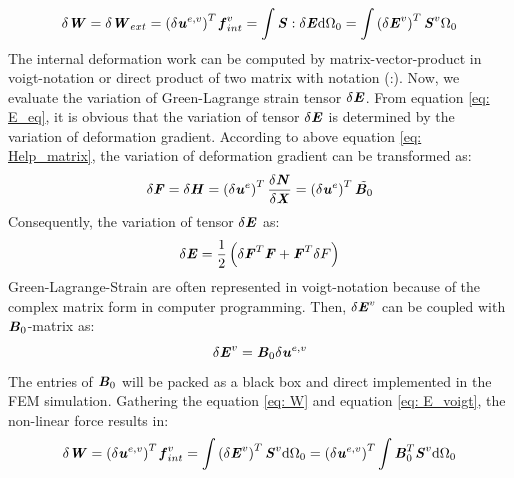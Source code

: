 \begin{equation} \label{eq: W}
\delta \textbf{\textit{W}} = \delta \textbf{\textit{W}}_{ext} = \left(\delta \textbf{\textit{u}}^{e,v}\right)^T \textbf{\textit{f}}_{int}^v = \int \textbf{\textit{S}} : \delta \textbf{\textit{E}} \mathrm{d}\Omega_0 = \int \left( \delta \textbf{\textit{E}}^v\right)^T \textbf{\textit{S}}^v \mathrm{\Omega_0}
\end{equation}
The internal deformation work can be computed by matrix-vector-product in voigt-notation or direct product of two matrix with notation (:). Now, we evaluate the variation of Green-Lagrange strain tensor $\delta \textbf{\textit{E}}$. From equation \ref{eq: E_eq}, it is obvious that the variation of tensor $\delta \textbf{\textit{E}}$ is determined by the variation of deformation gradient. According to above equation \ref{eq: Help_matrix}, the variation of deformation gradient can be transformed as:
\begin{equation}
\delta \textbf{\textit{F}} = \delta \textbf{\textit{H}} = \left(\delta \textbf{\textit{u}}^e\right)^T \frac{\delta \textbf{\textit{N}}}{\delta \textbf{\textit{X}}} = \left(\delta \textbf{\textit{u}}^e\right)^T \tilde{\textbf{\textit{B}}_0}
\end{equation}
Consequently, the variation of tensor $\delta \textbf{\textit{E}}$ as:
\begin{equation}
\delta \textbf{\textit{E}} = \frac{1}{2} \left(\delta \textbf{\textit{F}}^T \textbf{\textit{F}} + \textbf{\textit{F}}^T \delta F \right)
\end{equation}
Green-Lagrange-Strain are often represented in voigt-notation because of the complex matrix form in computer programming. Then, $\delta \textbf{\textit{E}}^v$ can be coupled with $\textbf{\textit{B}}_0$-matrix as:
\begin{equation} \label{eq: E_voigt}
\delta \textbf{\textit{E}}^v = \textbf{\textit{B}}_0 \delta \textbf{\textit{u}}^{e,v}
\end{equation} 
The entries of $\textbf{\textit{B}}_0$ will be packed as a black box and direct implemented in the FEM simulation. Gathering the equation \ref{eq: W} and equation \ref{eq: E_voigt}, the non-linear force results in:
\begin{equation}
\delta \textbf{\textit{W}} = \left(\delta \textbf{\textit{u}}^{e,v}\right)^T \textbf{\textit{f}}_{int}^v = \int \left(\delta \textbf{\textit{E}}^v\right)^T \textbf{\textit{S}}^v \mathrm{d}\Omega_0 = \left( \delta \textbf{\textit{u}}^{e,v}\right)^T \int \textbf{\textit{B}}_0^T \textbf{\textit{S}}^v \mathrm{d}\Omega_0
\end{equation}
